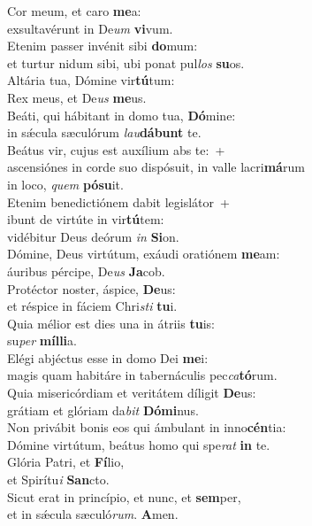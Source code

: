 \evenverse Cor meum, et caro \textbf{me}a:~\*\\
\evenverse exsultavérunt in De\textit{um} \textbf{vi}vum.\\
\oddverse Etenim passer invénit sibi \textbf{do}mum:~\*\\
\oddverse et turtur nidum sibi, ubi ponat pul\textit{los} \textbf{su}os.\\
\evenverse Altária tua, Dómine vir\textbf{tú}tum:~\*\\
\evenverse Rex meus, et De\textit{us} \textbf{me}us.\\
\oddverse Beáti, qui hábitant in domo tua, \textbf{Dó}mine:~\*\\
\oddverse in sǽcula sæculórum \textit{lau}\textbf{dá}\textbf{bunt} te.\\
\evenverse Beátus vir, cujus est auxílium abs te:~+\\
\evenverse  ascensiónes in corde suo dispósuit, in valle lacri\textbf{má}rum~\*\\
\evenverse in loco, \textit{quem} \textbf{pó}\textbf{su}it.\\
\oddverse Etenim benedictiónem dabit legislátor~+\\
\oddverse  ibunt de virtúte in vir\textbf{tú}tem:~\*\\
\oddverse vidébitur Deus deórum \textit{in} \textbf{Si}on.\\
\evenverse Dómine, Deus virtútum, exáudi oratiónem \textbf{me}am:~\*\\
\evenverse áuribus pércipe, De\textit{us} \textbf{Ja}cob.\\
\oddverse Protéctor noster, áspice, \textbf{De}us:~\*\\
\oddverse et réspice in fáciem Chri\textit{sti} \textbf{tu}i.\\
\evenverse Quia mélior est dies una in átriis \textbf{tu}is:~\*\\
\evenverse su\textit{per} \textbf{míl}\textbf{li}a.\\
\oddverse Elégi abjéctus esse in domo Dei \textbf{me}i:~\*\\
\oddverse magis quam habitáre in tabernáculis pec\textit{ca}\textbf{tó}rum.\\
\evenverse Quia misericórdiam et veritátem díligit \textbf{De}us:~\*\\
\evenverse grátiam et glóriam da\textit{bit} \textbf{Dó}\textbf{mi}nus.\\
\oddverse Non privábit bonis eos qui ámbulant in inno\textbf{cén}tia:~\*\\
\oddverse Dómine virtútum, beátus homo qui spe\textit{rat} \textbf{in} te.\\
\evenverse Glória Patri, et \textbf{Fí}lio,~\*\\
\evenverse et Spirítu\textit{i} \textbf{San}cto.\\
\oddverse Sicut erat in princípio, et nunc, et \textbf{sem}per,~\*\\
\oddverse et in sǽcula sæculó\textit{rum}. \textbf{A}men.\\
